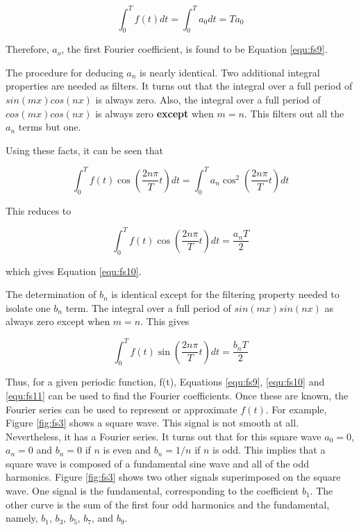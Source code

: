 \begin{equation}
\int_0^Tf(t)dt=\int_0^Ta_0dt=Ta_0
\label{equ:fs14}
\end{equation}

Therefore, $a_o$, the first Fourier coefficient, is found to be Equation \ref{equ:fs9}.

The procedure for deducing $a_n$ is nearly identical. Two additional integral properties are needed as filters. It turns out that the integral over a full period of $sin(mx)cos(nx)$ is always zero. Also, the integral over a full period of $cos(mx)cos(nx)$ is always zero {\bf except} when $m=n$. This filters out all the $a_n$ terms but one.

Using these facts, it can be seen that

\begin{equation}
\int_0^Tf(t)\cos\left(\dfrac{2n\pi}{T}t\right)dt=\int_0^Ta_n\cos^2\left(\dfrac{2n\pi}{T}t\right)dt
\label{equ:fs15}
\end{equation}

This reduces to

\begin{equation}
\int_0^Tf(t)\cos\left(\dfrac{2n\pi}{T}t\right)dt=\dfrac{a_nT}{2}
\label{equ:fs16}
\end{equation}

which gives Equation \ref{equ:fs10}.

The determination of $b_n$ is identical except for the filtering property needed to isolate one $b_n$ term. The integral over a full period of $sin(mx)sin(nx)$ as always zero except when $m=n$. This gives

\begin{equation}
\int_0^Tf(t)\sin\left(\dfrac{2n\pi}{T}t\right)dt=\dfrac{b_nT}{2}
\label{equ:fs17}
\end{equation}

Thus, for a given periodic function, f(t), Equations \ref{equ:fs9}, \ref{equ:fs10} and \ref{equ:fs11} can be used to find the Fourier coefficients. Once these are known, the Fourier series can be used to represent or approximate $f(t)$. For example, Figure \ref{fig:fs3} shows a square wave. This signal is not smooth at all. Nevertheless, it has a Fourier series. It turns out that for this square wave $a_0=0$, $a_n=0$ and $b_n=0$ if $n$ is even and $b_n=1/n$ if $n$ is odd. This implies that a square wave is composed of a fundamental sine wave and all of the odd harmonics. Figure \ref{fig:fs3} shows two other signals superimposed on the square wave. One signal is the fundamental, corresponding to the coefficient $b_1$. The other curve is the sum of the first four odd harmonics and the fundamental, namely, $b_1$, $b_3$, $b_5$, $b_7$, and $b_9$.

